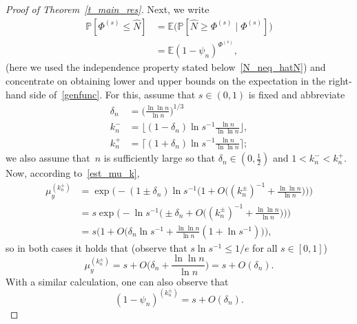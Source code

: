 \documentclass[10pt]{amsart}
\theoremstyle{definition}\newtheorem{defi}[theo]{Definition}\newtheorem{rema}[theo]{Remark}\newtheorem{exam}[theo]{Example}\newtheorem{exem}[theo]{Example}\newtheorem{nota}[theo]{Notation}
\newcommand{\1}[1]{{\mathbf 1}{\{#1\}}}
\newcommand{\hN}{{\widehat N}}
\newcommand{\8}{{\infty}}
\newcommand{\IP}{{\mathbb P}}
\newcommand{\IE}{{\mathbb E}}
\begin{document}
\begin{proof}[Proof of Theorem~\ref{t_main_res}]
Next, we write
\begin{align}
\IP[\Phi^{(s)}\leq \hN] &= \IE \big(\IP[\hN \geq \Phi^{(s)}\mid\Phi^{(s)}]\big)\nonumber \\
&=\IE (1-\psi_n)^{\Phi^{(s)}},\label{genfunc}
\end{align}
(here we used the independence property stated below~\eqref{N_neq_hatN}) and concentrate on obtaining lower and upper bounds on the expectation in the right-hand side of~\eqref{genfunc}. For this, assume that $s\in(0,1)$ is fixed and abbreviate
\begin{align*}
\delta_n &= \Big(\frac{\ln\ln n}{\ln n}\Big)^{1/3}\\
k_n^{-} &= \Big\lfloor(1-\delta_n)\ln s^{-1} \frac{\ln n}{\ln\ln n}
\Big\rfloor,\\
k_n^{+} &= \Big\lceil(1+\delta_n)\ln s^{-1} \frac{\ln n}{\ln\ln n}
\Big\rceil;
\end{align*}
we also assume that~$n$ is sufficiently large so that $\delta_n \in(0,\frac{1}{2})$ and $1<k_n^{-}<k_n^{+}$. Now, according to~\eqref{est_mu_k},
\begin{align*}
\mu_y^{(k_n^{\pm})} &= \exp\Big(-(1\pm \delta_n)\ln s^{-1}
\Big(1+O\Big((k_n^{\pm})^{-1}+\frac{\ln\ln n}{\ln n}\Big)\Big)\Big)\\
& = s \exp\Big(-\ln s^{-1}
\Big(\pm \delta_n+O\Big((k_n^{\pm})^{-1}+\frac{\ln\ln n}{\ln n}\Big)\Big)\Big)\\
& = s \Big(1+O\Big(\delta_n\ln s^{-1} + \frac{\ln\ln n}{\ln n}(1+\ln s^{-1})\Big)\Big),
\end{align*}
so in both cases it holds that (observe that $s\ln s^{-1}\leq 1/e$ for all $s\in[0,1]$)
\begin{equation}\label{muk_ourcase}
\mu_y^{(k_n^{\pm})} = s + O\Big(\delta_n +\frac{\ln\ln n}{\ln n} \Big) = s + O(\delta_n).
\end{equation}
With a similar calculation, one can also observe that
\begin{equation}\label{1-psi_ourcase}
(1-\psi_n)^{(k_n^{\pm})} = s + O(\delta_n).
\end{equation}


\end{proof}
\end{document}
